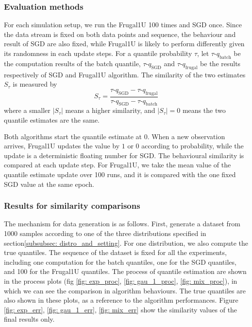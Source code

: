 \subsubsection{Evaluation methods}

For each simulation setup, we run the Frugal1U 100 times and SGD once. Since the data stream is fixed on both data points and sequence, the behaviour and result of SGD are also fixed, while Frugal1U is likely to perform differently given its randomness in each update steps. For a quantile probability $\tau$, let $\tau$-$q_{\text{batch}}$ be the computation results of the batch quantile, $\tau$-$q_{\text{SGD}}$ and $\tau$-$q_{\text{frugal}}$ be the results respectively of SGD and Frugal1U algorithm. The similarity of the two estimates $S_\tau$ is measured by
\begin{equation}
    S_\tau = \frac{ \tau\text{-}q_{\text{SGD}} - \tau\text{-}q_{\text{frugal}} }{ \tau\text{-}q_{\text{SGD}} - \tau\text{-}q_{\text{batch}} }
    \label{eq: frugal_err}
\end{equation}
where a smaller $|S_\tau|$ means a higher similarity, and $|S_\tau| = 0$ means the two quantile estimates are the same.

Both algorithms start the quantile estimate at $0$. When a new observation arrives, Frugal1U updates the value by $1$ or $0$ according to probability, while the update is a deterministic floating number for SGD. The behavioural similarity is compared at each update step. For Frugal1U, we take the mean value of the quantile estimate update over 100 runs, and it is compared with the one fixed SGD value at the same epoch. 

\subsubsection{Results for similarity comparisons}

The mechanism for data generation is as follows. First, generate a dataset from 1000 samples according to one of the three distributions specified in section\ref{subsubsec: distro_and_setting}. For one distribution, we also compute the true quantiles. The sequence of the dataset is fixed for all the experiments, including one computation for the batch quantiles, one for the SGD quantiles, and 100 for the Frugal1U quantiles. The process of quantile estimation are shown in the process plots (fig \ref{fig: exp_proc}, \ref{fig: gau_1_proc}, \ref{fig: mix_proc}), in which we can see the comparison in algorithm behaviours. The true quantiles are also shown in these plots, as a reference to the algorithm performances.
Figure \ref{fig: exp_err}, \ref{fig: gau_1_err}, \ref{fig: mix_err} show the similarity values of the final results only.

